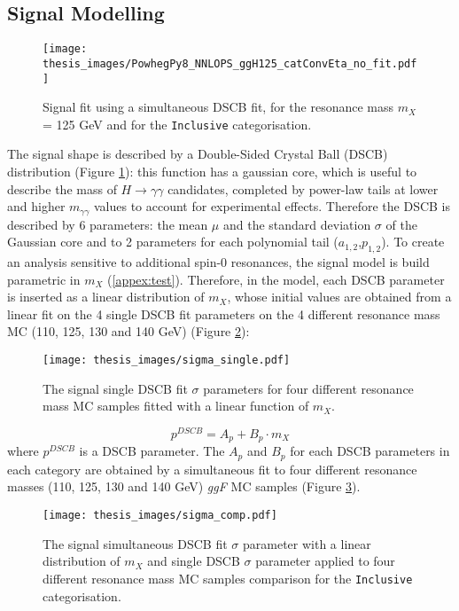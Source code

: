 \documentclass[a4paper, oneside, 11pt, openright]{book}
\begin{document}
 			\subsection{Signal Modelling}
 				\begin{figure}
 					\centering
 					\texttt{[image: thesis\_images/PowhegPy8\_NNLOPS\_ggH125\_catConvEta\_no\_fit.pdf]}
 					\caption{Signal fit using a simultaneous DSCB fit, for the resonance mass $m_X$ = 125 GeV and for the \texttt{Inclusive} categorisation.}
 					\label{fig:sig_fit}
 				\end{figure}
 				The signal shape is described by a Double-Sided Crystal Ball (DSCB) distribution (Figure \ref{fig:sig_fit}): this function has a gaussian core, which is useful to describe the mass of $H\to\gamma\gamma$ candidates, completed by power-law tails at lower and higher $m_{\gamma\gamma}$ values to account for experimental effects. Therefore the DSCB is described by 6 parameters: the mean $\mu$ and the standard deviation $\sigma$ of the Gaussian core and to 2 parameters for each polynomial tail ($a_{1,2}$,$p_{1,2}$). To create an analysis sensitive to additional spin-0 resonances, the signal model is build parametric in $m_X$ (\ref{appex:test}). Therefore, in the model, each DSCB parameter is inserted as a linear distribution of $m_X$, whose initial values are obtained from a linear fit on the 4 single DSCB fit parameters on the 4 different resonance mass MC (110, 125, 130 and 140 GeV)  (Figure \ref{fig:sigma_single}):
 				\begin{figure}
 					\centering
 					\texttt{[image: thesis\_images/sigma\_single.pdf]}
 					\caption{The signal single DSCB fit $\sigma$ parameters for four different resonance mass MC samples fitted with a linear function of $m_X$.}
 					\label{fig:sigma_single}
 				\end{figure}
 				\begin{equation}\label{eq:DSCB_par}
 					p^{DSCB} = A_p + B_p\cdot m_X
 				\end{equation}
 				where $p^{DSCB}$ is a DSCB parameter. The $A_p$ and $B_p$ for each DSCB parameters in each category are obtained by a simultaneous fit to four different resonance masses (110, 125, 130 and 140 GeV) \textit{ggF} MC samples (Figure \ref{fig:sigma_fit}).
 				\begin{figure}
 					\centering
 					\texttt{[image: thesis\_images/sigma\_comp.pdf]}
 					\caption{The signal simultaneous DSCB fit $\sigma$ parameter with a linear distribution of $m_X$ and single DSCB $\sigma$ parameter applied to four different resonance mass MC samples comparison for the \texttt{Inclusive} categorisation.}
 					\label{fig:sigma_fit}
 				\end{figure}
 				
\end{document}
